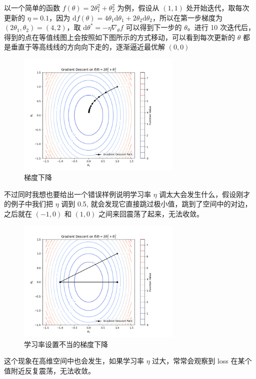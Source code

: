 以一个简单的函数 $f(\theta) = 2\theta_1^2 + \theta_2^2$ 为例，假设从 $(1, 1)$ 处开始迭代，取每次更新的 $\eta = 0.1$，因为 $\mathrm{d}f(\theta) = 4\theta_1 \mathrm{d}\theta_1 + 2\theta_2 \mathrm{d}\theta_2$，所以在第一步梯度为 $(2\theta_1, \theta_2) = (4, 2)$，取 $\mathrm{d}\theta^* = -\eta \nabla_\theta f$ 可以得到下一步的 $\theta$。进行 10 次迭代后，得到的点在等值线图上会按照如下图所示的方式移动，可以看到每次更新的 $\theta$ 都是垂直于等高线线的方向向下走的，逐渐逼近最优解 $(0, 0)$
\begin{figure}[H]
\centering
\includegraphics[width=0.7\textwidth]{img/gradient_descent.png}
\caption{梯度下降}
\end{figure}

不过同时我想也要给出一个错误样例说明学习率 $\eta$ 调太大会发生什么，假设刚才的例子中我们把 $\eta$ 调到 0.5, 就会发现它直接跳过极小值，跳到了空间中的对边，之后就在 $(-1, 0)$ 和 $(1, 0)$ 之间来回震荡了起来，无法收敛。
\begin{figure}[H]
\centering
\includegraphics[width=0.7\textwidth]{img/gradient_descent_0.5.png}
\caption{学习率设置不当的梯度下降}
\end{figure}

这个现象在高维空间中也会发生，如果学习率 $\eta$ 过大，常常会观察到 loss 在某个值附近反复震荡，无法收敛。


